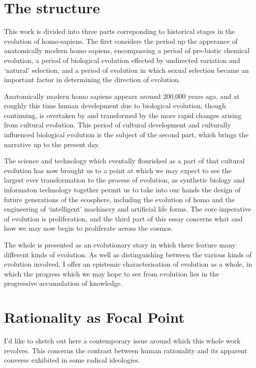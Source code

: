 \documentclass[10pt,titlepage]{book}
\begin{document}
\section{The structure}

This work is divided into three parts correponding to historical stages in the evolution of homo-sapiens.
The first considers the period up the apperance of anatomically modern homo sapiens, encompassing a period of pre-biotic chemical evolution, a period of biological evolution effected by undirected variation and `natural' selection, and a period of evolution in which sexual selection became an important factor in determining the direction of evolution.

Anatomically modern homo sapiens appears around 200,000 years ago, and at roughly this time human development due to biological evolution, though continuing, is overtaken by and transformed by the more rapid changes arising from cultural evolution.
This period of cultural development and culturally influenced biological evolution is the subject of the second part, which brings the narrative up to the present day.

The science and technology which eventally flourished as a part of that cultural evolution has now brought us to a point at which we may expect to see the largest ever transformation to the process of evolution, as synthetic biology and informaton technology together permit us to take into our hands the design of future generations of the ecosphere, including the evolution of homo and the engineering of `intelligent' machinery and artificial life forms.
The core imperative of evolution is proliferation, and the third part of this essay concerns what and how we may now begin to proliferate across the cosmos.

The whole is presented as an evolutionary story in which there feature many different kinds of evolution.
As well as distinguishing between the various kinds of evolution involved, I offer an epistemic characterisation of evolution as a whole, in which the progress which we may hope to see from evolution lies in the progressive accumulation of knowledge.

\section{Rationality as Focal Point}

I'd like to sketch out here a contemporary issue around which this whole work revolves.
This concerns the contrast between human rationality and its apparent converse exhibited in some radical ideologies.
\end{document}
